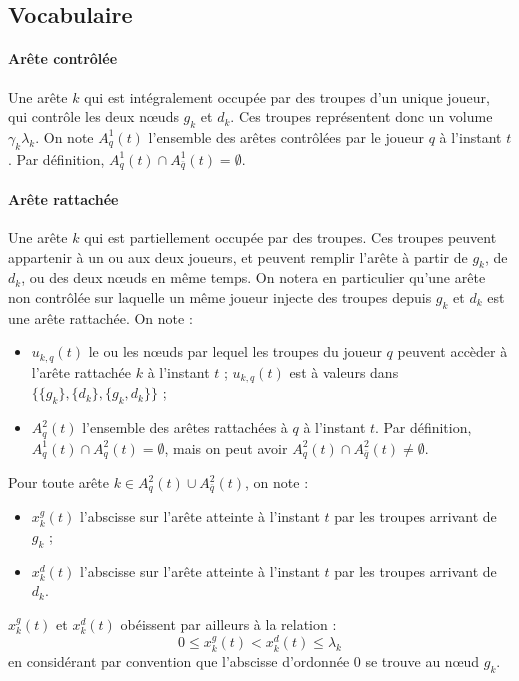 \documentclass[a4paper,11pt,headings=normal]{scrartcl}
\theoremstyle{mythm}
\begin{document}
\subsection{Vocabulaire}

\paragraph{Arête contrôlée} Une arête $k$ qui est intégralement occupée
par des troupes d'un unique joueur, qui contrôle les deux nœuds $g_k$
et $d_k$. Ces troupes représentent donc un volume $\gamma_k
\lambda_k$. On note $A^1_q(t)$ l'ensemble des arêtes contrôlées par le
joueur $q$ à l'instant $t$. Par définition, $A^1_q(t) \cap A^1_{\bar
  q}(t) = \emptyset$.

\paragraph{Arête rattachée} Une arête $k$ qui est partiellement occupée
par des troupes. Ces troupes peuvent appartenir à un ou aux deux
joueurs, et peuvent remplir l'arête à partir de $g_k$, de $d_k$, ou
des deux nœuds en même temps. On notera en particulier qu'une arête
non contrôlée sur laquelle un même joueur injecte des troupes depuis
$g_k$ et $d_k$ est une arête rattachée. On note :
\begin{itemize}
  \item $u_{k,q}(t)$ le ou les nœuds par lequel les troupes du joueur
    $q$ peuvent accèder à l'arête rattachée $k$ à l'instant $t$ ;
    $u_{k,q}(t)$ est à valeurs dans $\{\{g_k\}, \{d_k\}, \{g_k,
    d_k\}\}$ ;

  \item $A^2_q(t)$ l'ensemble des arêtes rattachées à $q$ à l'instant
    $t$. Par définition, $A^1_q(t) \cap A^2_q(t) = \emptyset$, mais on
    peut avoir $A^2_q(t) \cap A^2_{\bar q}(t) \neq \emptyset$.
\end{itemize}
Pour toute arête $k \in A^2_q(t) \cup A^2_{\bar q}(t)$, on note :
\begin{itemize}
  \item $x^g_k(t)$ l'abscisse sur l'arête atteinte à l'instant $t$ par
    les troupes arrivant de $g_k$ ;

  \item $x^d_k(t)$ l'abscisse sur l'arête atteinte à l'instant $t$ par
    les troupes arrivant de $d_k$.
\end{itemize}
$x^g_k(t)$ et $x^d_k(t)$ obéissent par ailleurs à la relation :
\begin{equation}
  0 \leq x^g_k(t) < x^d_k(t) \leq \lambda_k
\end{equation}
en considérant par convention que l'abscisse d'ordonnée 0 se trouve au
nœud $g_k$.
\end{document}
